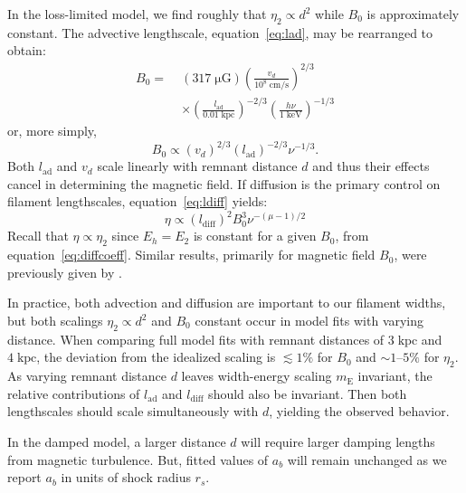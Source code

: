 \documentclass[iop, apj, numberedappendix]{emulateapj}
\newcommand*{\mt}{\mathrm}
\newcommand*{\unit}[1]{\;\mt{#1}}  %
\newcommand*{\abt}{\mathord{\sim}} %
\newcommand*{\mE}{m_\mt{E}}
\newcommand*{\muG}{\unit{\mu G}}
\begin{document}
In the loss-limited model, we find roughly that $\eta_2 \propto d^2$ while
$B_0$ is approximately constant.  The advective lengthscale,
equation~\eqref{eq:lad}, may be rearranged to obtain:
\begin{align}
    B_0 =\; &(317 \muG) \left(\frac{v_d}{10^8 \unit{cm/s}}\right)^{2/3}
                \nonumber \\
            &\times \left(\frac{l_{\mt{ad}}}{0.01 \unit{kpc}}\right)^{-2/3}
                \left(\frac{h\nu}{1 \unit{keV}}\right)^{-1/3}
\end{align}
or, more simply,
\begin{equation}
    B_0 \propto \left(v_d\right)^{2/3}
                \left(l_{\mt{ad}}\right)^{-2/3} \nu^{-1/3} .
\end{equation}
Both $l_{\mt{ad}}$ and $v_d$ scale linearly with remnant distance $d$ and thus
their effects cancel in determining the magnetic field.  If diffusion is the
primary control on filament lengthscales, equation~\eqref{eq:ldiff} yields:
\begin{equation}
    \eta \propto \left(l_{\mt{diff}}\right)^2 B_0^{3} \nu^{-(\mu - 1)/2}
\end{equation}
Recall that $\eta \propto \eta_2$ since $E_h = E_2$ is constant for a given
$B_0$, from equation~\eqref{eq:diffcoeff}.  Similar results, primarily for
magnetic field $B_0$, were previously given by \citet{parizot2006}.

In practice, both advection and diffusion are important to our filament widths,
but both scalings $\eta_2 \propto d^2$ and $B_0$ constant occur in model fits
with varying distance.  When comparing full model fits with remnant distances
of $3 \unit{kpc}$ and $4 \unit{kpc}$, the deviation from the idealized scaling
is $\lesssim 1 \%$ for $B_0$ and $\abt 1$--$5\%$ for $\eta_2$.  As varying
remnant distance $d$ leaves width-energy scaling $\mE$ invariant, the relative
contributions of $l_{\mt{ad}}$ and $l_{\mt{diff}}$ should also be invariant.
Then both lengthscales should scale simultaneously with $d$, yielding the
observed behavior.

In the damped model, a larger distance $d$ will require larger damping lengths
from magnetic turbulence.  But, fitted values of $a_b$ will remain unchanged as
we report $a_b$ in units of shock radius $r_s$.

\end{document}

